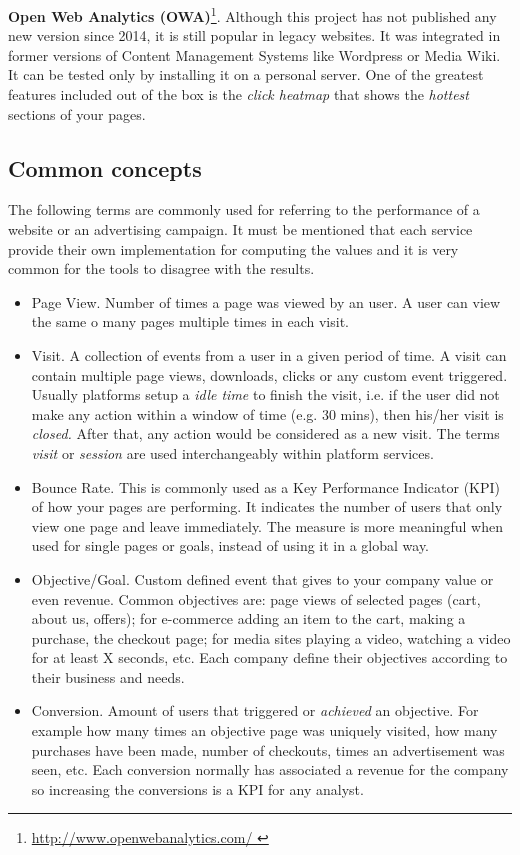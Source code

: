 \documentclass[preprint,12pt,3p]{elsarticle}
\begin{document}
\textbf{Open Web Analytics (OWA)}\footnote{\url{ http://www.openwebanalytics.com/ }}.
Although this project has not published any new version since 2014, it is still popular in legacy websites. It was integrated in former versions of Content Management Systems like Wordpress or Media Wiki. It can be tested only by installing it on a personal server. One of the greatest features included out of the box is the \textit{click heatmap} that shows the \textit{hottest} sections of your pages.


\subsection{Common concepts}
The following terms are commonly used for referring to the performance of a website or an advertising campaign. It must be mentioned that each service provide their own implementation for computing the values and it is very common for the tools to disagree with the results.

\begin{itemize}
  \item Page View. Number of times a page was viewed by an user. A user can view the same o many pages multiple times in each visit.
  \item Visit. A collection of events from a user in a given period of time. A visit can contain multiple page views, downloads, clicks or any custom event triggered. Usually platforms setup a \textit{idle time} to finish the visit, i.e. if the user did not make any action within a window of time (e.g. 30 mins), then his/her visit is \textit{closed.} After that, any action would be considered as a new visit. The terms \textit{visit} or \textit{session} are used interchangeably within platform services.
  \item Bounce Rate. This is commonly used as a Key Performance Indicator (KPI) of how your pages are performing. It indicates the number of users that only view one page and leave immediately. The measure is more meaningful when used for single pages or goals, instead of using it in a global way.
  \item Objective/Goal. Custom defined event that gives to your company value or even revenue. Common objectives are: page views of selected pages (cart, about us, offers); for e-commerce adding an item to the cart, making a purchase, the checkout page; for media sites playing a video, watching a video for at least X seconds, etc. Each company define their objectives according to their business and needs.
  \item Conversion. Amount of users that triggered or \textit{achieved} an objective. For example how many times an objective page was uniquely visited, how many purchases have been made, number of checkouts, times an advertisement was seen, etc. Each conversion normally has associated a revenue for the company so increasing the conversions is a KPI for any analyst.
\end{itemize}
\end{document}
